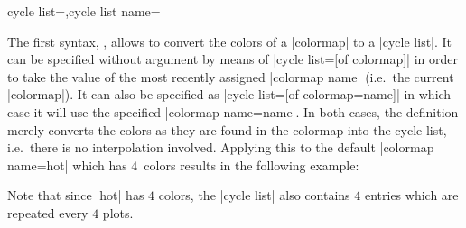\begin{pgfplotskeylist}{cycle list=,cycle list name=}
{The first syntax, , allows to convert the colors of a |colormap| to a |cycle list|. It can be specified without argument by means of |cycle list={[of colormap]}| in order to take the value of the most recently assigned |colormap name| (i.e.\ the current |colormap|). It can also be specified as |cycle list={[of colormap=name]}| in which case it will use the specified |colormap name=name|. In both cases, the definition merely converts the colors as they are found in the colormap into the cycle list, i.e.\ there is no interpolation involved. Applying this to the default |colormap name=hot| which has $4$~colors results in the following example:
\begin{codeexample}[]
\end{codeexample}
Note that since |hot| has $4$ colors, the |cycle list| also contains $4$ entries which are repeated every $4$ plots.

}
\end{pgfplotskeylist}
